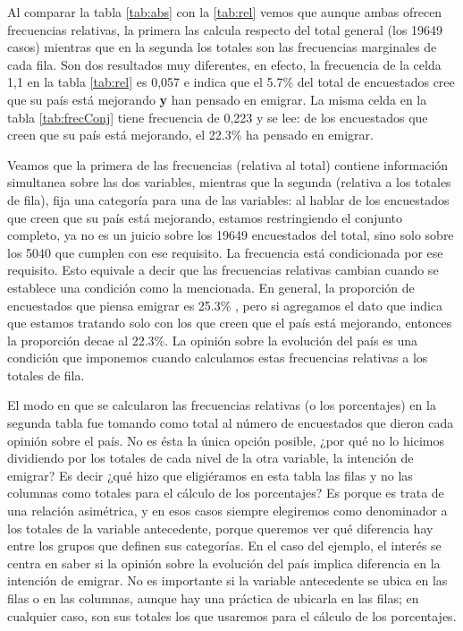 \documentclass[]{book}
\begin{document}
Al comparar la tabla \ref{tab:abs} con la \ref{tab:rel} vemos que aunque ambas ofrecen frecuencias relativas, la primera las calcula respecto del total general (los
19649 casos) mientras que en la segunda los totales son las frecuencias marginales de cada fila. Son dos resultados muy diferentes, en efecto, la frecuencia de la celda 1,1 en la tabla \ref{tab:rel} es 0,057 e indica que el 5.7\% del total de encuestados cree que su país está mejorando \textbf{y} han pensado en emigrar. La misma celda en la tabla \ref{tab:frecConj} tiene frecuencia de 0,223 y se lee: de los encuestados que creen que su país está mejorando, el 22.3\% ha pensado en emigrar.

Veamos que la primera de las frecuencias (relativa al total) contiene
información simultanea sobre las dos variables, mientras que la segunda (relativa a los totales de fila), fija una categoría para una de las variables: al hablar de los encuestados que creen que su país está mejorando, estamos restringiendo el conjunto completo, ya no es un juicio sobre los 19649 encuestados del total, sino solo sobre los 5040 que cumplen con ese requisito. La frecuencia está condicionada por ese requisito. Esto equivale a decir que las frecuencias relativas cambian cuando se establece una condición como la mencionada. En general, la proporción de encuestados que piensa emigrar es 25.3\% , pero si agregamos el dato que indica que estamos tratando solo con los que creen que el país está mejorando, entonces la proporción decae al 22.3\%. La opinión sobre la evolución del país es una condición que imponemos cuando calculamos estas frecuencias relativas a los totales de fila.

El modo en que se calcularon las frecuencias relativas (o los
porcentajes) en la segunda tabla fue tomando como total al número de encuestados que dieron cada opinión sobre el país. No es ésta la única opción posible, ¿por qué no lo hicimos dividiendo por los totales de cada nivel de la otra variable, la intención de emigrar?
Es decir ¿qué hizo que eligiéramos en esta tabla las filas y no las
columnas como totales para el cálculo de los porcentajes? Es porque es trata de una relación asimétrica, y en esos casos siempre elegiremos como denominador a los totales de la variable
antecedente, porque queremos ver qué diferencia hay entre los grupos que definen sus categorías. En el caso del ejemplo, el interés se centra en saber si la opinión sobre la evolución del país implica diferencia en la intención de emigrar. No es importante si la variable antecedente se ubica en las filas o en las columnas, aunque hay una práctica de ubicarla en las filas; en cualquier caso, son sus totales los que usaremos para el cálculo de los porcentajes.
\end{document}
